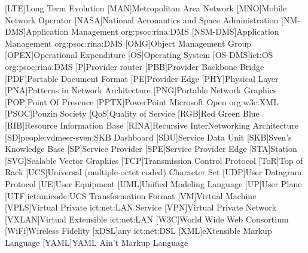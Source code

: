 \begin{acronym}[ARCFIREX]
    [LTE]{Long Term Evolution}
    [MAN]{Metropolitan Area Network}
    [MNO]{Mobile Network Operator}
    [NASA]{National Aeronautics and Space Administration}
    [NM-DMS]{Application Management \acs{org:psoc:rina:DMS}}
    [NSM-DMS]{Application Management \acs{org:psoc:rina:DMS}}
    [OMG]{Object Management Group}
    [OPEX]{Operational Expenditure}
    [OS]{Operating System}
    [OS-DMS]{\acl{ict:OS} \acs{org:psoc:rina:DMS}}
    [P]{Provider router}
    [PBB]{Provider Backbone Bridge}
    [PDF]{Portable Document Format}
    [PE]{Provider Edge}
    [PHY]{Physical Layer}
    [PNA]{Patterns in Network Architecture}
    [PNG]{Portable Network Graphics}
    [POP]{Point Of Presence}
    [PPTX]{PowerPoint Microsoft Open \acs{org:w3c:XML}}
    [PSOC]{Pouzin Society}
    [QoS]{Quality of Service}
    [RGB]{Red Green Blue}
    [RIB]{Resource Information Base}
    [RINA]{Recursive InterNetworking Architecture}
    [SD]{\acs{people:vdmeer-sven:SKB} Dashboard}
    [SDU]{Service Data Unit}
    [SKB]{Sven's Knowledge Base}
    [SP]{Service Provider}
    [SPE]{Service Provider Edge}
    [STA]{Station}
    [SVG]{Scalable Vector Graphics}
    [TCP]{Transmission Control Protocol}
    [ToR]{Top of Rack}
    [UCS]{Universal (multiple-octet coded) Character Set}
    [UDP]{User Datagram Protocol}
    [UE]{User Equipment}
    [UML]{Unified Modeling Language}
    [UP]{User Plane}
    [UTF]{\acs{ict:unicode:UCS} Transformation Format}
    [VM]{Virtual Machine}
    [VPLS]{Virtual Private \acs{ict:net:LAN} Service}
    [VPN]{Virtual Private Network}
    [VXLAN]{Virtual Extensible \acs{ict:net:LAN}}
    [W3C]{World Wide Web Consortium}
    [WiFi]{Wireless Fidelity}
    [xDSL]{any \acs{ict:net:DSL}}
    [XML]{eXtensible Markup Language}
    [YAML]{YAML Ain't Markup Language}
\end{acronym}
